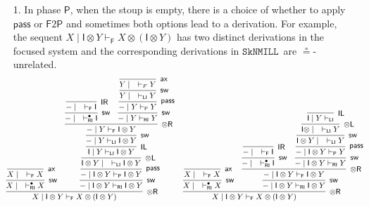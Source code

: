 \documentclass[copyright,creativecommons]{eptcs}
\theoremstyle{definition}
\newcommand{\tl}{\otimes \mathsf{L}}
\newcommand{\tr}{\otimes \mathsf{R}}
\newcommand{\pass}{\mathsf{pass}}
\newcommand{\unitl}{\mathsf{IL}}
\newcommand{\unitr}{\mathsf{IR}}
\newcommand{\ax}{\mathsf{ax}}
\newcommand{\ot}{\otimes}
\newcommand{\I}{\mathsf{I}}
\newcommand{\RI}{\mathsf{RI}}
\newcommand{\LI}{\mathsf{LI}}
\newcommand{\Pass}{\mathsf{P}}
\newcommand{\F}{\mathsf{F}}
\newcommand{\SkNMILL}{$\mathtt{SkNMILL}$}
\begin{document}
\begin{enumerate}
  \item[1.] In phase $\Pass$, when the stoup is empty, there is a choice of whether to apply $\pass$ or $\F2\Pass$ and sometimes both options lead to a derivation. For example, the sequent $X \mid \I \ot Y \vdash_{\F} X \ot (\I \ot Y)$ has two distinct derivations in the focused system and the corresponding derivations in \SkNMILL\ are $\circeq$-unrelated.
  \begin{equation*}
  \small
\hspace*{-5mm}
    \begin{array}{cc}
    \infer[\tr]{X \mid \I \ot Y \vdash_{\F} X \ot (\I \ot Y)}{
    \infer[\mathsf{sw}]{X \mid \quad \vdash^{\bullet}_{\RI} X}{
      \infer[\ax]{X \mid \quad \vdash_{\F} X}{}
    }
      &
      \infer[\mathsf{sw}]{{-} \mid \I \ot Y \vdash_{\RI} \I \ot Y}{
        \infer[\pass]{{-} \mid \I \ot Y \vdash_{\Pass} \I \ot Y}{
          \infer[\tl]{\I \ot Y \mid \quad \vdash_{\LI} \I \ot Y}{
            \infer[\unitl]{\I \mid Y \vdash_{\LI} \I \ot Y}{
              \infer[\mathsf{sw}]{{-} \mid Y \vdash_{\LI} \I \ot Y}{
                \infer[\tr]{{-} \mid Y \vdash_{\F} \I \ot Y}{
                  \infer[\mathsf{sw}]{{-} \mid \quad \vdash^{\bullet}_{\RI} \I}{
                    \infer[\unitr]{{-} \mid \quad \vdash_{\F} \I}{}
                  }
                  &
                  \infer[\mathsf{sw}]{{-} \mid Y \vdash_{\RI} Y}{
                    \infer[\pass]{{-} \mid Y \vdash_{\Pass} Y}{
                      \infer[\mathsf{sw}]{Y \mid \quad \vdash_{\LI} Y}{
                        \infer[\ax]{Y \mid \quad \vdash_{F} Y}{}
                      }
                    }
                  }
                }
              }
            }
          }
        }
      }
    }
    &
    \infer[\tr]{X \mid \I \ot Y \vdash_{\F} X \ot (\I \ot Y)}{
      \infer[\mathsf{sw}]{X \mid \quad \vdash^{\bullet}_{\RI} X}{
        \infer[\ax]{X \mid \quad \vdash_{\F} X}{}
      }
      &
      \infer[\mathsf{sw}]{{-} \mid \I \ot Y \vdash_{\RI} \I \ot Y}{
        \infer[\tr]{{-} \mid \I \ot Y \vdash_{\F} \I \ot Y}{
          \infer[\mathsf{sw}]{{-} \mid \quad \vdash^{\bullet}_{\RI} \I}{
            \infer[\unitr]{{-} \mid \quad \vdash_{\F} \I}{}
          }
          &
          \infer[\mathsf{sw}]{{-} \mid \I \ot Y \vdash_{\RI} Y}{
            \infer[\pass]{{-} \mid \I \ot Y \vdash_{\Pass} Y}{
              \infer[\mathsf{sw}]{\I \ot Y \mid \quad \vdash_{\LI} Y}{
                \infer[\tl]{\I \ot \mid \quad \vdash_{\LI} Y}{
                  \infer[\unitl]{\I \mid Y \vdash_{\LI}}{
}}}}}}}}
\end{array}
\end{equation*}
\end{enumerate}
\end{document}
